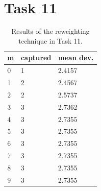 \section {Task 11}

\begin{table}[]
\caption{Results of the reweighting technique in Task 11.}
\label{table:task11:results}
\centering
\begin{tabular}{l|ll}
m & captured & mean dev. \\
\hline
0 & 1 & 2.4157 \\
1 & 2 & 2.4567 \\
2 & 2 & 2.5737 \\
3 & 3 & 2.7362 \\
4 & 3 & 2.7355 \\
5 & 3 & 2.7355 \\
6 & 3 & 2.7355 \\
7 & 3 & 2.7355 \\
8 & 3 & 2.7355 \\
9 & 3 & 2.7355
\end{tabular}
\end{table}

